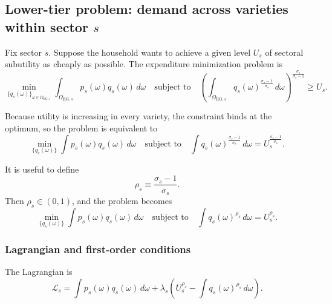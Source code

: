 \documentclass[11pt]{article}
\begin{document}
\subsection{Lower-tier problem: demand across varieties within sector \(s\)}

Fix sector \(s\). Suppose the household wants to achieve a given level \(U_s\) of sectoral subutility as cheaply as possible. The expenditure minimization problem is
\begin{equation}
\min_{\{q_s(\omega)\}_{\omega\in\Omega_{\mathrm{EG},s}}}
\int_{\Omega_{\mathrm{EG},s}} p_s(\omega)q_s(\omega)\,d\omega
\quad\text{subject to}\quad
\left(\int_{\Omega_{\mathrm{EG},s}} q_s(\omega)^{\frac{\sigma_s-1}{\sigma_s}}\,d\omega\right)^{\frac{\sigma_s}{\sigma_s-1}}\ge U_s.
\end{equation}

Because utility is increasing in every variety, the constraint binds at the optimum, so the problem is equivalent to
\begin{equation}
\min_{\{q_s(\omega)\}}
\int p_s(\omega)q_s(\omega)\,d\omega
\quad\text{subject to}\quad
\int q_s(\omega)^{\frac{\sigma_s-1}{\sigma_s}}\,d\omega = U_s^{\frac{\sigma_s-1}{\sigma_s}}.
\end{equation}

It is useful to define
\begin{equation}
\rho_s \equiv \frac{\sigma_s-1}{\sigma_s}.
\end{equation}
Then \(\rho_s\in(0,1)\), and the problem becomes
\begin{equation}
\min_{\{q_s(\omega)\}}
\int p_s(\omega)q_s(\omega)\,d\omega
\quad\text{subject to}\quad
\int q_s(\omega)^{\rho_s}\,d\omega = U_s^{\rho_s}.
\end{equation}

\subsubsection{Lagrangian and first-order conditions}

The Lagrangian is
\begin{equation}
\mathcal{L}_s = \int p_s(\omega)q_s(\omega)\,d\omega + \lambda_s\left(U_s^{\rho_s}-\int q_s(\omega)^{\rho_s}\,d\omega\right).
\end{equation}
\end{document}
